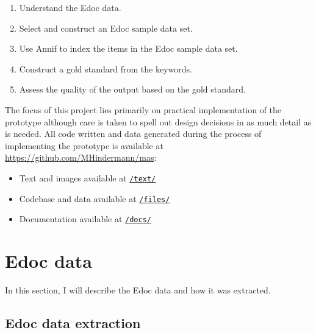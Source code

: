 \begin{enumerate}
\def\labelenumi{\arabic{enumi}.}
\tightlist
\item
  Understand the Edoc data.
\item
  Select and construct an Edoc sample data set.
\item
  Use Annif to index the items in the Edoc sample data set.
\item
  Construct a gold standard from the keywords.
\item
  Assess the quality of the output based on the gold standard.
\end{enumerate}

The focus of this project lies primarily on practical implementation of
the prototype although care is taken to spell out design decisions in as
much detail as is needed. All code written and data generated during the
process of implementing the prototype is available at
\url{https://github.com/MHindermann/mas}:

\begin{itemize}
\tightlist
\item
  Text and images available at
  \href{https://github.com/MHindermann/mas/tree/main/text}{\texttt{/text/}}
\item
  Codebase and data available at
  \href{https://github.com/MHindermann/mas/tree/main/files}{\texttt{/files/}}
\item
  Documentation available at
  \href{https://github.com/MHindermann/mas/tree/main/docs}{\texttt{/docs/}}
\end{itemize}

\hypertarget{edoc-data}{%
\section{Edoc data}\label{edoc-data}}

In this section, I will describe the Edoc data and how it was extracted.

\hypertarget{edoc-data-extraction}{%
\subsection{Edoc data extraction}\label{edoc-data-extraction}}

